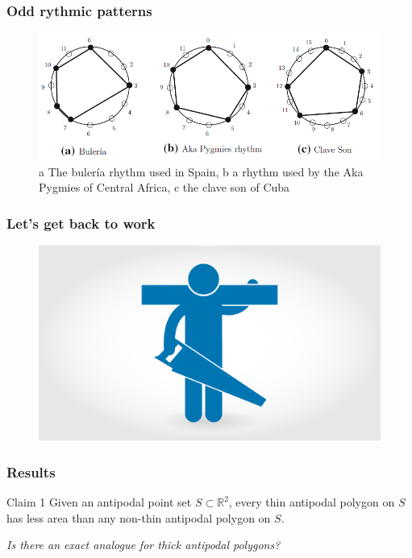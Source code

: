 \documentclass{beamer}
\newcommand{\R}{\mathbb{R}}
\begin{document}
\begin{frame}
\frametitle{Odd rythmic patterns}
\begin{figure}
\includegraphics[scale=0.5]{rythm}
\caption{a The bulería rhythm used in Spain, b a rhythm used by the Aka Pygmies of Central Africa, c the
clave son of Cuba}
\end{figure}
\end{frame}

\begin{frame}
\frametitle{Let's get back to work}
\begin{figure}
\includegraphics[scale=0.22]{work}
\end{figure}
\end{frame}

\begin{frame}
\frametitle{Results}
\begin{alertblock}{Claim 1}
Given an antipodal point set $S \subset \R^2$, every thin antipodal polygon on $S$ has
less area than any non-thin antipodal polygon on $S$.
\end{alertblock}\pause
\vspace{1cm}

\emph{Is there an exact analogue for thick antipodal polygons?}

\end{frame}
\end{document}
